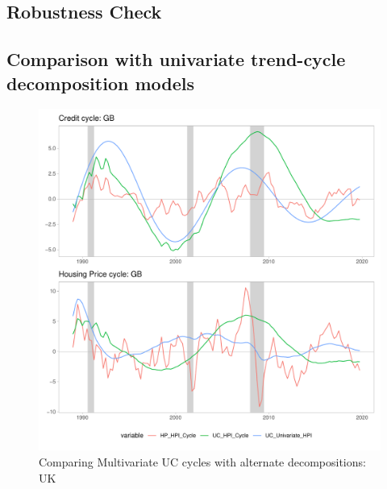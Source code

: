 \documentclass[12pt]{article}
\begin{document}
\begin{outline}[enumerate]
		\section{Robustness Check}
		\subsection{Comparison with univariate trend-cycle decomposition models}
		
		\begin{figure}[h!]
			\caption{Comparing Multivariate UC cycles with alternate decompositions: UK }	
			\centerline{\includegraphics[scale=0.7]{../../Regression/AR_2/Output/graphs/HP_Credit_2graphs_GB.pdf}}
		\end{figure}
	

\end{outline}
\end{document}

